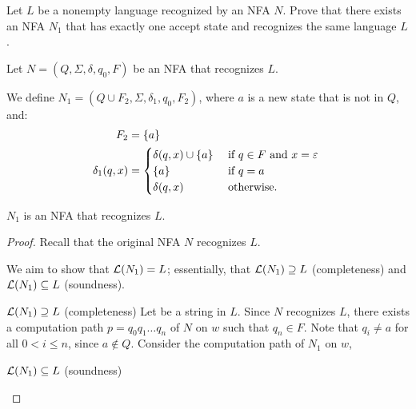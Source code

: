 \begin{problem}
  \begin{enumalph}
    \item Let $L$ be a nonempty language recognized by an NFA $N$.
      Prove that there exists an NFA $N_1$ that has exactly one accept state
      and recognizes the same language $L$.
      \begin{Answer}
        Let $N = (Q, \Sigma, \delta, q_0, F)$ be an NFA that recognizes $L$.
        
        \step
        We define $N_1 = (Q \cup F_2, \Sigma, \delta_1, q_0, F_2)$,
        where $a$ is a new state that is not in $Q$, and:
        \begin{align*}
          F_2 &= \left\{a\right\} \\
          \delta_1(q, x) &= \begin{cases}
            \delta(q, x) \cup \left\{a\right\} &\text{ if $q \in F$ and $x = \varepsilon$ }\\
            \left\{a\right\} &\text{ if $q = a$ }\\
            \delta(q, x) & \text{ otherwise. }
          \end{cases}
        \end{align*}
        \begin{lemma}
          $N_1$ is an NFA that recognizes $L$.
          \begin{proof}
            Recall that the original NFA $N$ recognizes $L$.

            \step
            We aim to show that $\mathcal{L}(N_1) = L$;
            essentially, that $\mathcal{L}(N_1) \supseteq L$ (completeness)
            and $\mathcal{L}(N_1) \subseteq L$ (soundness).

            \begin{enumroman}
              \item $\mathcal{L}(N_1) \supseteq L$ (completeness)
                Let 
                be a string in $L$. Since $N$ recognizes $L$,
                there exists a computation path $p = q_0q_1\ldots q_n$
                of $N$ on $w$ such that $q_n \in F$.
                Note that $q_i \ne a$ for all $0 < i \le n$, since $a \notin Q$.
                Consider the computation path of $N_1$ on $w$,
              \item $\mathcal{L}(N_1) \subseteq L$ (soundness)
            \end{enumroman}




\end{proof}
\end{lemma}
\end{Answer}
\end{enumalph}
\end{problem}
